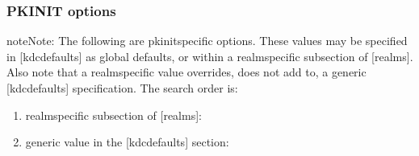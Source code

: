 \documentclass[letterpaper,10pt,english]{sphinxmanual}
\begin{document}
\subsubsection{PKINIT options}
\label{\detokenize{admin/conf_files/kdc_conf:pkinit-options}}
\begin{sphinxadmonition}{note}{Note:}
\sphinxAtStartPar
The following are pkinit\sphinxhyphen{}specific options.  These values may
be specified in {[}kdcdefaults{]} as global defaults, or within
a realm\sphinxhyphen{}specific subsection of {[}realms{]}.  Also note that a
realm\sphinxhyphen{}specific value over\sphinxhyphen{}rides, does not add to, a generic
{[}kdcdefaults{]} specification.  The search order is:
\end{sphinxadmonition}
\begin{enumerate}
%
\item {} 
\sphinxAtStartPar
realm\sphinxhyphen{}specific subsection of {[}realms{]}:

\begin{sphinxVerbatim}[commandchars=\\\{\}]
\PYG{p}{[}\PYG{p}{]}
      
          
\end{sphinxVerbatim}

\item {} 
\sphinxAtStartPar
generic value in the {[}kdcdefaults{]} section:

\begin{sphinxVerbatim}[commandchars=\\\{\}]
\PYG{p}{[}\PYG{p}{]}
      
\end{sphinxVerbatim}

\end{enumerate}
\end{document}
